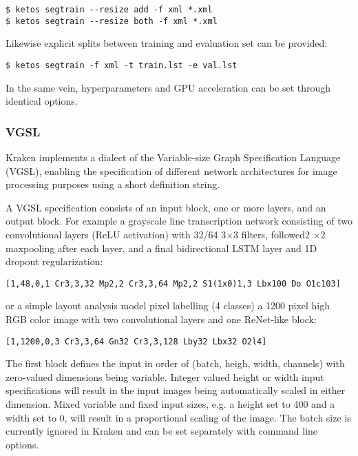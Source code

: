 \begin{verbatim}
$ ketos segtrain --resize add -f xml *.xml
$ ketos segtrain --resize both -f xml *.xml
\end{verbatim}

Likewise explicit splits between training and evaluation set can be provided:

\begin{verbatim}
$ ketos segtrain -f xml -t train.lst -e val.lst
\end{verbatim}

In the same vein, hyperparameters and GPU acceleration can be set through
identical options.

\subsubsection{VGSL}
\label{vgsl}
Kraken implements a dialect of the Variable-size Graph Specification Language
(VGSL), enabling the specification of different network architectures for image
processing purposes using a short definition string.

A VGSL specification consists of an input block, one or more layers, and an
output block. For example a grayscale line transcription network consisting of
two convolutional layers (ReLU activation) with 32/64 3$\times$3 filters,
followed2 $\times$2 maxpooling after each layer, and a final bidirectional LSTM
layer and 1D dropout regularization:

\begin{verbatim}
[1,48,0,1 Cr3,3,32 Mp2,2 Cr3,3,64 Mp2,2 S1(1x0)1,3 Lbx100 Do O1c103]
\end{verbatim}

or a simple layout analysis model pixel labelling (4 classes) a 1200 pixel high
RGB color image with two convolutional layers and one ReNet-like block:

\begin{verbatim}
[1,1200,0,3 Cr3,3,64 Gn32 Cr3,3,128 Lby32 Lbx32 O2l4]
\end{verbatim}

The first block defines the input in order of (batch, heigh, width, channels)
with zero-valued dimensions being variable. Integer valued height or width
input specifications will result in the input images being automatically scaled
in either dimension. Mixed variable and fixed input sizes, e.g. a height set to
400 and a width set to 0, will result in a proportional scaling of the image.
The batch size is currently ignored in Kraken and can be set separately with
command line options. 

